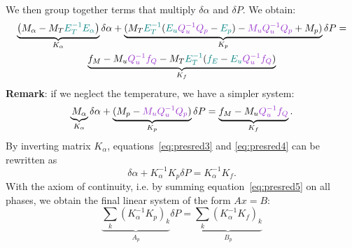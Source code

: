 We then group together terms that multiply $\delta\alpha$ and $\delta P$. We obtain: 
\begin{multline}
\underbrace{\parent{M_{\alpha} - M_T{\color{myteal}E_T^{-1}E_\alpha}}}_{K_\alpha}\delta \alpha +\underbrace{(M_T{\color{myteal}E_T^{-1}}({\color{myteal}E_u}{\color{mydarkorchid}Q_u^{-1}Q_p} - {\color{myteal}E_p}) - {\color{mydarkorchid}M_uQ_u^{-1}Q_p}+M_p)}_{K_p}\delta P=  \\\underbrace{f_M - M_u{\color{mydarkorchid}Q_u^{ - 1}f_Q} - M_T{\color{myteal} E_T^{-1}}({\color{myteal}f_E} - {\color{myteal} E_u}{\color{mydarkorchid}Q_u^{-1}f_Q})}_{K_f}\label{eq:presred3}
\end{multline}
\textbf{Remark}: if we neglect the temperature, we have a simpler system: 
\begin{equation}
    \underbrace{M_{\alpha}}_{K_\alpha}\delta \alpha +\underbrace{(M_p-{\color{mydarkorchid} M_uQ_u^{-1}Q_p})}_{K_p}\delta P= \underbrace{f_M-M_u{\color{mydarkorchid} Q_u^{-1}f_Q}}_{K_f}.\label{eq:presred4}
\end{equation}
By inverting matrix $K_\alpha$, equations~\eqref{eq:presred3} and \eqref{eq:presred4} can be rewritten as
\begin{equation}
\delta \alpha + K_\alpha^{-1}K_p\delta P=K_\alpha^{-1}K_f.\label{eq:presred5}
\end{equation}
With the axiom of continuity, i.e. by summing equation~\eqref{eq:presred5} on all phases, we obtain the final linear system of the form $Ax=B$: 
\begin{equation}
\underbrace{\sum_k (K_\alpha^{-1}K_p)_k}_{A_p}\delta P=\underbrace{\sum_k (K_\alpha^{-1}K_f)_k}_{B_p}
\end{equation}

